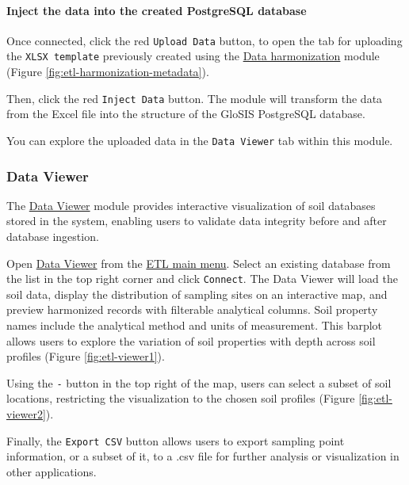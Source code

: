 \documentclass[
  10pt,
  b5paper,
  oneside]{book}
\begin{document}
\paragraph*{Inject the data into the created PostgreSQL database}\label{inject-the-data-into-the-created-postgresql-database}

Once connected, click the red \texttt{Upload\ Data} button, to open the tab for uploading the \texttt{XLSX\ template} previously created using the \href{http://localhost:3000/harmonization}{Data harmonization} module (Figure \ref{fig:etl-harmonization-metadata}).

Then, click the red \texttt{Inject\ Data} button. The module will transform the data from the Excel file into the structure of the GloSIS PostgreSQL database.

You can explore the uploaded data in the \texttt{Data\ Viewer} tab within this module.

\subsubsection{Data Viewer}\label{data-viewer}

The \href{http://localhost:3000/dataviewer}{Data Viewer} module provides interactive visualization of soil databases stored in the system, enabling users to validate data integrity before and after database ingestion.

Open \href{http://localhost:3000/dataviewer}{Data Viewer} from the \href{http://localhost:3000}{ETL main menu}. Select an existing database from the list in the top right corner and click \texttt{Connect}. The Data Viewer will load the soil data, display the distribution of sampling sites on an interactive map, and preview harmonized records with filterable analytical columns. Soil property names include the analytical method and units of measurement. This barplot allows users to explore the variation of soil properties with depth across soil profiles (Figure \ref{fig:etl-viewer1}).

Using the \texttt{-} button in the top right of the map, users can select a subset of soil locations, restricting the visualization to the chosen soil profiles (Figure \ref{fig:etl-viewer2}).

Finally, the \texttt{Export\ CSV} button allows users to export sampling point information, or a subset of it, to a .csv file for further analysis or visualization in other applications.
\end{document}
